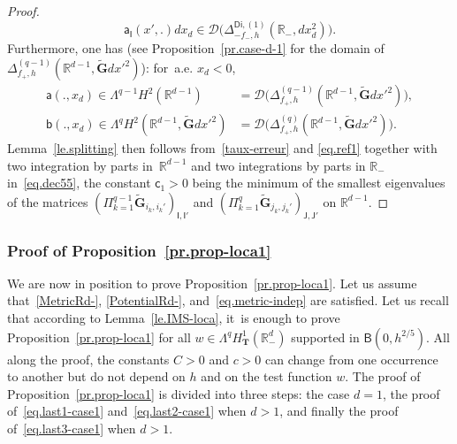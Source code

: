 \documentclass[10pt]{amsart}
\newcommand{\mbf}[1]{\mathbf{#1}}
\theoremstyle{plain}
\theoremstyle{definition}
\begin{document}
\begin{proof}
\[
\mathsf a_{\mathsf I}(x',.) dx_d \in \mathcal D\bigl(\Delta_{-f_-,h}^{\mathsf{Di},(1)}(\mathbb R_-, dx_d^2) \bigr).
\]
Furthermore, one has (see Proposition~\ref{pr.case-d-1} for the
domain of $ \Delta_{f_+,h}^{(q-1)}(\mathbb R^{d-1}, \tilde{\mbf G}dx'^2)$): for~a.e. $x_d< 0$,
\begin{align*}
\mathsf a(.,x_d) \in \Lambda^{q-1}H^2 (\mathbb R^{d-1}) &= \mathcal D\bigl(\Delta_{f_+,h}^{(q-1)}(\mathbb R^{d-1}, \tilde{\mbf G}dx'^2)\bigr),
\\
\mathsf b(.,x_d) \in \Lambda^{q}H^2 (\mathbb R^{d-1}, \tilde{\mbf G}dx'^2)&= \mathcal D\bigl(\Delta_{f_+,h}^{(q)}(\mathbb R^{d-1}, \tilde{\mbf G}dx'^2)\bigr).
\end{align*}
Lemma~\ref{le.splitting} then follows from~\eqref{taux-erreur} and \eqref{eq.ref1} together with two integration by parts in~$\mathbb R^{d-1}$ and two integrations by parts in $\mathbb R_-$ in~\eqref{eq.dec55}, the constant $\mathsf c_1 >0$ being the minimum of the smallest eigenvalues of the matrices $(\Pi_{k=1}^{q-1} \tilde{\mbf G}_{i_k,i_k'})_{\mathsf I,\mathsf I'}$ and $ (\Pi_{k=1}^{q} \tilde{\mbf G}_{j_k,j_k'})_{\mathsf J,\mathsf J'}$ on $\mathbb R^{d-1}$.
\end{proof}

\subsubsection{Proof of Proposition~\ref{pr.prop-loca1}}\label{sec:prop-loca1-proof}
We are now in position to prove Proposition~\ref{pr.prop-loca1}.
Let us assume that~\ref{MetricRd-}, \ref{PotentialRd-}, and~\eqref{eq.metric-indep} are satisfied. Let us recall that according to Lemma~\ref{le.IMS-loca}, it~is enough to prove Proposition~\ref{pr.prop-loca1} for all
$w\in \Lambda^q H^1_{\mbf T}(\mathbb R^d_-)$ supported in $\mathsf B(0,h^{2/5 })$. All along the proof, the constants $C>0$ and $c>0$ can change from one occurrence to another but do not depend on $h$ and on the test function $w$.
The proof of Proposition~\ref{pr.prop-loca1} is divided into three
steps: the case $d=1$, the proof of~\eqref{eq.last1-case1}
and~\eqref{eq.last2-case1} when $d>1$, and finally the proof of~\eqref{eq.last3-case1} when $d>1$.
\end{document}
